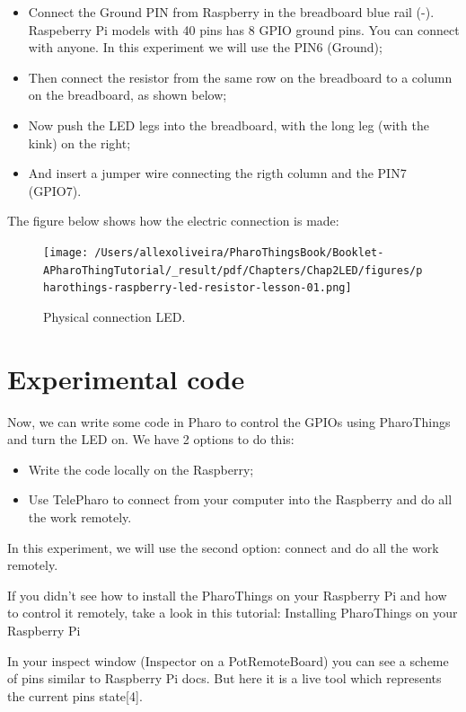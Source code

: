 \documentclass[10pt,twoside,english]{_support/latex/sbabook/sbabook}
\begin{document}
\begin{itemize}
\item Connect the Ground PIN from Raspberry in the breadboard blue rail (-). Raspeberry Pi models with 40 pins has 8 GPIO ground pins. You can connect with anyone. In this experiment we will use the PIN6 (Ground);
\item Then connect the resistor from the same row on the breadboard to a column on the breadboard, as shown below;
\item Now push the LED legs into the breadboard, with the long leg (with the kink) on the right;
\item And insert a jumper wire connecting the rigth column and the PIN7 (GPIO7).
\end{itemize}

The figure below shows how the electric connection is made:


\begin{figure}

\begin{center}
\texttt{[image: /Users/allexoliveira/PharoThingsBook/Booklet-APharoThingTutorial/\_result/pdf/Chapters/Chap2LED/figures/pharothings-raspberry-led-resistor-lesson-01.png]}\caption{Physical connection LED.\label{physicalLed}}\end{center}
\end{figure}

\section{Experimental code}
Now, we can write some code in Pharo to control the GPIOs using PharoThings and turn the LED on. We have 2 options to do this:

\begin{itemize}
\item Write the code locally on the Raspberry;
\item Use TelePharo to connect from your computer into the Raspberry and do all the work remotely.
\end{itemize}

In this experiment, we will use the second option: connect and do all the work remotely. 

If you didn’t see how to install the PharoThings on your Raspberry Pi and how to control it remotely, take a look in this tutorial: Installing PharoThings on your Raspberry Pi

In your inspect window (Inspector on a PotRemoteBoard) you can see a scheme of pins similar to Raspberry Pi docs. But here it is a live tool which represents the current pins state{[}4{]}.
\end{document}
